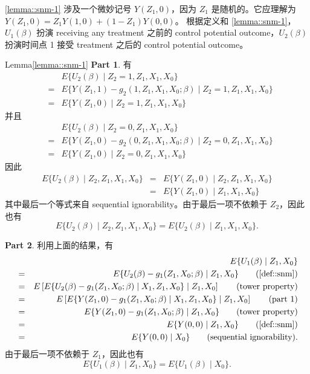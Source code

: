 \cref{lemma::snm-1} 涉及一个微妙记号 $ Y(Z_1,0) $，因为 $Z_1$ 是随机的。它应理解为 $  Y(Z_1,0) = Z_1 Y(1,0) +(1-Z_1) Y(0,0)$。
根据定义和 \cref{lemma::snm-1}，$U_1(\beta)$ 扮演 receiving any treatment 之前的 control potential outcome，$U_2(\beta)  $ 扮演时间点 1 接受 treatment 之后的 control potential outcome。


\begin{myproof}{Lemma}{\cref{lemma::snm-1}}
{\bf Part 1}. 
有
\begin{eqnarray*}
&&E\{  U_2(\beta)  \mid Z_2=1, Z_1, X_1, X_0 \}  \\
&=&    E\{  Y(Z_1,1)- g_2(1, Z_1, X_1, X_0;\beta)   \mid Z_2=1, Z_1, X_1, X_0 \}  \\
&=& E\{  Y(Z_1,0)   \mid Z_2=1, Z_1, X_1, X_0 \} 
\end{eqnarray*}
并且
\begin{eqnarray*}
&&E\{  U_2(\beta)  \mid Z_2=0, Z_1, X_1, X_0 \} \\
 &=&    E\{  Y(Z_1,0)- g_2(0, Z_1, X_1, X_0;\beta)   \mid Z_2=0, Z_1, X_1, X_0 \}   \\
&=& E\{  Y(Z_1,0)   \mid Z_2=0, Z_1, X_1, X_0 \}
\end{eqnarray*}
因此
\begin{eqnarray*}
E\{  U_2(\beta)  \mid Z_2, Z_1, X_1, X_0 \}  &=&  E\{  Y(Z_1,0)   \mid Z_2, Z_1, X_1, X_0 \} \\
&=& E\{  Y(Z_1,0)   \mid   Z_1, X_1, X_0 \}
\end{eqnarray*}
其中最后一个等式来自 sequential ignorability。由于最后一项不依赖于 $Z_2$，因此也有
$$
E\{  U_2(\beta)  \mid Z_2, Z_1, X_1, X_0 \}  = E\{  U_2(\beta)  \mid  Z_1, X_1, X_0 \} . 
$$

{\bf Part 2}. 
利用上面的结果，有
 \begin{eqnarray*}
&&E\{  U_1(\beta)  \mid  Z_1, X_0 \}  \\
&=&  E\{  U_2(\beta)  - g_1( Z_1, X_0;\beta)  \mid  Z_1, X_0 \} \qquad (\text{\cref{def::snm}}) \\
&=& E\left[    E\{  U_2(\beta)  - g_1( Z_1, X_0;\beta)  \mid X_1,  Z_1, X_0 \}   \mid  Z_1, X_0 \right]  \qquad (\text{tower property})  \\
&=&  E\left[    E\{ Y(Z_1,0) - g_1( Z_1, X_0;\beta)  \mid X_1,  Z_1, X_0 \}   \mid  Z_1, X_0 \right]   \qquad (\text{part 1}) \\
&=&  E\{ Y(Z_1,0) - g_1( Z_1, X_0;\beta)  \mid  Z_1, X_0 \} \qquad (\text{tower property})  \\
&=& E\{ Y(0,0)  \mid  Z_1, X_0 \} \qquad (\text{\cref{def::snm}}) \\
&=&  E\{ Y(0,0)  \mid  X_0 \}  \qquad (\text{sequential ignorability}).
\end{eqnarray*}
由于最后一项不依赖于 $Z_1$，因此也有
$$
E\{  U_1(\beta)  \mid  Z_1, X_0 \}   = E\{  U_1(\beta)  \mid   X_0 \}.   
$$
\end{myproof}


